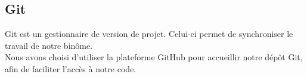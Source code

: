 	\subsection{Git}
	Git est un gestionnaire de version de projet. Celui-ci permet de synchroniser le travail de notre binôme.\\
	Nous avons choisi d'utiliser la plateforme GitHub pour accueillir notre dépôt Git, afin de faciliter l'accès à notre code.
